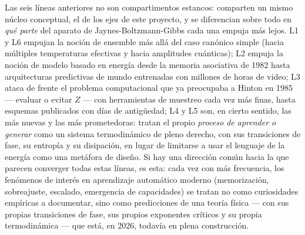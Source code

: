 \documentclass[12pt]{article}
\begin{document}
Las seis líneas anteriores no son compartimentos estancos: comparten un mismo núcleo conceptual, el de los ejes de este proyecto, y se diferencian sobre todo en \emph{qué parte} del aparato de Jaynes-Boltzmann-Gibbs cada una empuja más lejos. L1 y L6 empujan la noción de ensemble más allá del caso canónico simple (hacia múltiples temperaturas efectivas y hacia amplitudes cuánticas); L2 empuja la noción de modelo basado en energía desde la memoria asociativa de 1982 hasta arquitecturas predictivas de mundo entrenadas con millones de horas de video; L3 ataca de frente el problema computacional que ya preocupaba a Hinton en 1985 --- evaluar o evitar $Z$ --- con herramientas de muestreo cada vez más finas, hasta esquemas publicados con días de antigüedad; L4 y L5 son, en cierto sentido, las más nuevas y las más prometedoras: tratan el propio \emph{proceso de aprender o generar} como un sistema termodinámico de pleno derecho, con sus transiciones de fase, su entropía y su disipación, en lugar de limitarse a usar el lenguaje de la energía como una metáfora de diseño. Si hay una dirección común hacia la que parecen converger todas estas líneas, es esta: cada vez con más frecuencia, los fenómenos de interés en aprendizaje automático moderno (memorización, sobreajuste, escalado, emergencia de capacidades) se tratan no como curiosidades empíricas a documentar, sino como predicciones de una teoría física --- con sus propias transiciones de fase, sus propios exponentes críticos y su propia termodinámica --- que está, en 2026, todavía en plena construcción.
\end{document}
